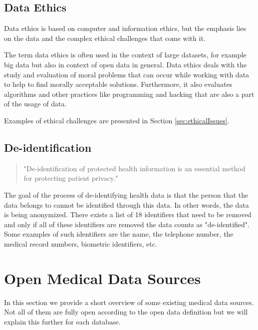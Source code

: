 \documentclass[a4paper, 11pt]{article}
\begin{document}
\subsection{Data Ethics} 
Data ethics is based on computer and information ethics, but the emphasis lies on the data and the complex ethical challenges that come with it. \cite{Floridi2016dataEthics}


The term data ethics is often used in the context of large datasets, for example big data but also in context of open data in general. Data ethics deals with the study and evaluation of moral problems that can occur while working with data to help to find morally acceptable solutions. Furthermore, it also evaluates algorithms and other practices like programming and hacking that are also a part of the usage of data. \cite{Floridi2016dataEthics}

Examples of ethical challenges are presented in Section \ref{sec:ethicalIssues}. 

\subsection{De-identification}
\begin{quote}
    "De-identification of protected health information is an essential method for protecting patient privacy." \cite[p.\ 1044]{kayaalp2017modes}
\end{quote}
The goal of the process of de-identifying health data is that the person that the data belongs to cannot be identified through this data. In other words, the data is being anonymized. There exists a list of 18 identifiers that need to be removed and only if all of these identifiers are removed the data counts as "de-identified". Some examples of such identifiers are the name, the telephone number, the medical record numbers, biometric identifiers, etc.  \cite{kayaalp2017modes, Hoffman2015} 

\section{Open Medical Data Sources}\label{sec:dataSources}
In this section we provide a short overview of some existing medical data sources. Not all of them are fully open according to the open data definition but we will explain this further for each database. 
\end{document}
